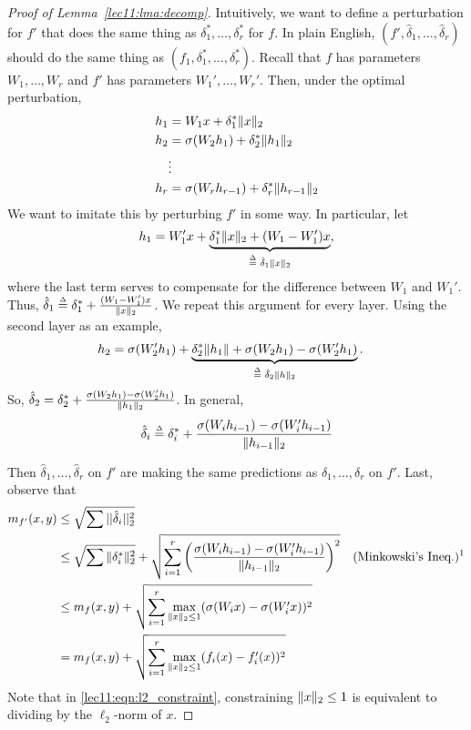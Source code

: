 \begin{proof}[Proof of Lemma~\ref{lec11:lma:decomp}]
	Intuitively, we want to define a perturbation for $f'$ that does the same thing as $\delta_1^*,\dots,\delta_r^*$ for $f$. In plain English, $(f', \hat{\delta}_1, \dots, \hat{\delta}_r)$ should do the same thing as $(f_1, \delta_1^*, \dots, \delta_r^*)$. Recall that $f$ has parameters $W_1, \dots, W_r$ and $f'$ has parameters $W_1', \dots, W_r'$. Then, under the optimal perturbation,
	\begin{align}
	h_1 &= W_1 x + \delta_1^* \|x\|_2 \\
	h_2 &= \sigma(W_2 h_1) + \delta_2^* \|h_1\|_2 \\
	&\vdots \nonumber \\
	h_r &= \sigma(W_r h_{r - 1}) + \delta_r^* \|h_{r - 1}\|_2
	\end{align}
	We want to imitate this by perturbing $f'$ in some way. In particular, let
	\begin{equation}
	h_1 = W_1'x + \underbrace{\delta_1^* \norm{x}_2 + (W_1 - W_1')x}_{\defeq \text{ }\hat{\delta}_1 \norm{x}_2},
	\end{equation}
	where the last term serves to compensate for the difference between $W_1$ and $W_1'$. Thus, $\hat{\delta}_1 \defeq \delta_1^* + \frac{(W_1 - W_1')x}{\norm{x}_2}$.
	We repeat this argument for every layer. Using the second layer as an example, 
	\begin{align}
	h_2 &= \sigma(W_2' h_1) + \underbrace{\delta_2^*\norm{h_1} + \sigma(W_2 h_1) - \sigma(W_2' h_1)}_{\defeq \text{ }\hat{\delta}_2 \norm{h}_2}.
	\end{align}
	So, $\hat{\delta}_2 = \delta_2^* + \frac{\sigma(W_2 h_1) - \sigma(W_2' h_1)}{\|h_1\|_2}$. In general, 
	\begin{align}
	\hat{\delta}_i \defeq \delta_i^* + \frac{\sigma(W_ih_{i-1}) - \sigma(W_i' h_{i-1})}{\norm{h_{i-1}}_2}
	\end{align} 
	
	Then $\hat{\delta}_1,\dots, \hat{\delta}_r$ on $f'$ are making the same predictions as $\delta_1, \dots, \delta_r$ on $f'$. Last, observe that
	\begin{align}
	m_{f'}(x, y) &\leq \sqrt{\sum ||\hat{\delta}_i||_2^2} \\
	&\leq \sqrt{\sum \norm{\delta_i^*}_2^2} + \sqrt{\sum_{i = 1}^r \left (\frac{\sigma(W_i h_{i-1}) - \sigma(W_i' h_{i-1})}{\norm{h_{i-1}}_2} \right)^2 } &\text{(Minkowski's Ineq.)\footnotemark}\\
	&\leq m_f(x, y) + \sqrt{\sum_{i=1}^r \max_{\norm{x}_2 \leq 1} (\sigma(W_i x)-\sigma(W'_i x))^2} \label{lec11:eqn:l2_constraint} \\
	&= m_f(x, y) + \sqrt{\sum_{i=1}^r \max_{\norm{x}_2 \leq 1} (f_i(x)-f_i'(x))^2}
	\end{align} 
	Note that in \eqref{lec11:eqn:l2_constraint}, constraining $\|x\|_2 \leq 1$ is equivalent to dividing by the $\ell_2$-norm of $x$.
\end{proof}

